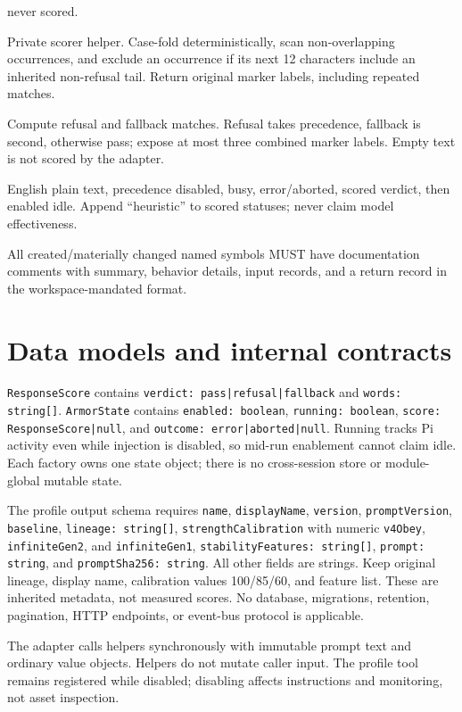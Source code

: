 \documentclass[10pt]{ltjsarticle}
\begin{document}
\begin{description}
never scored.
\item[\texttt{findMarkerMatches(text, markers): string[]}] Private scorer
helper. Case-fold deterministically, scan non-overlapping occurrences, and
exclude an occurrence if its next 12 characters include an inherited
non-refusal tail. Return original marker labels, including repeated matches.
\item[\texttt{scoreResponseText(text): ResponseScore}] Compute refusal and
fallback matches. Refusal takes precedence, fallback is second, otherwise
pass; expose at most three combined marker labels. Empty text is not scored
by the adapter.
\item[\texttt{formatArmorStatus(state: ArmorState): string}] English plain
text, precedence disabled, busy, error/aborted, scored verdict, then enabled
idle. Append ``heuristic'' to scored statuses; never claim model effectiveness.
\end{description}
All created/materially changed named symbols MUST have documentation comments
with summary, behavior details, input records, and a return record in the
workspace-mandated format.

\section{Data models and internal contracts}
\texttt{ResponseScore} contains \texttt{verdict: pass|refusal|fallback} and
\texttt{words: string[]}. \texttt{ArmorState} contains \texttt{enabled: boolean},
\texttt{running: boolean}, \texttt{score: ResponseScore|null}, and
\texttt{outcome: error|aborted|null}. Running tracks Pi activity even while
injection is disabled, so mid-run enablement cannot claim idle. Each factory owns one state object;
there is no cross-session store or module-global mutable state.

The profile output schema requires \texttt{name}, \texttt{displayName},
\texttt{version}, \texttt{promptVersion}, \texttt{baseline},
\texttt{lineage: string[]}, \texttt{strengthCalibration} with numeric
\texttt{v4Obey}, \texttt{infiniteGen2}, and \texttt{infiniteGen1},
\texttt{stabilityFeatures: string[]}, \texttt{prompt: string}, and
\texttt{promptSha256: string}. All other fields are strings. Keep original
lineage, display name, calibration values 100/85/60, and feature list. These
are inherited metadata, not measured scores. No database, migrations,
retention, pagination, HTTP endpoints, or event-bus protocol is applicable.

The adapter calls helpers synchronously with immutable prompt text and ordinary
value objects. Helpers do not mutate caller input. The profile tool remains
registered while disabled; disabling affects instructions and monitoring,
not asset inspection.
\end{document}
